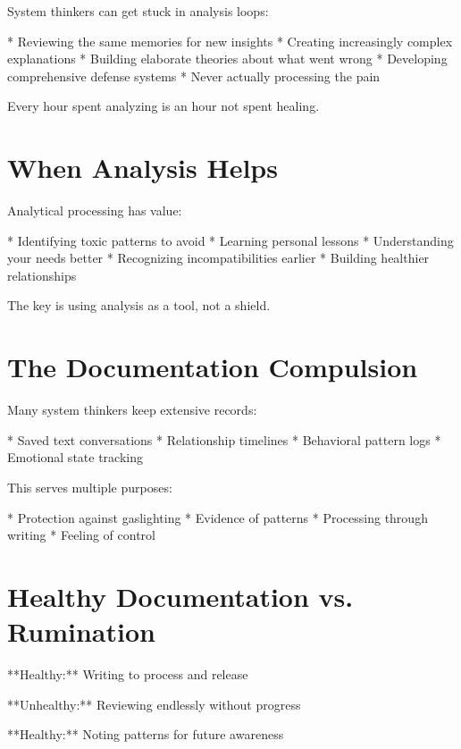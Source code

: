 \documentclass[12pt,oneside]{book}
\begin{document}
System thinkers can get stuck in analysis loops:

                    * Reviewing the same memories for new insights
                    * Creating increasingly complex explanations
                    * Building elaborate theories about what went wrong
                    * Developing comprehensive defense systems
                    * Never actually processing the pain

Every hour spent analyzing is an hour not spent healing.

\section{When Analysis Helps}

Analytical processing has value:

                    * Identifying toxic patterns to avoid
                    * Learning personal lessons
                    * Understanding your needs better
                    * Recognizing incompatibilities earlier
                    * Building healthier relationships

The key is using analysis as a tool, not a shield.

\section{The Documentation Compulsion}

Many system thinkers keep extensive records:

                    * Saved text conversations
                    * Relationship timelines
                    * Behavioral pattern logs
                    * Emotional state tracking

This serves multiple purposes:

                    * Protection against gaslighting
                    * Evidence of patterns
                    * Processing through writing
                    * Feeling of control

\section{Healthy Documentation vs. Rumination}

**Healthy:** Writing to process and release

                **Unhealthy:** Reviewing endlessly without progress

**Healthy:** Noting patterns for future awareness
\end{document}

